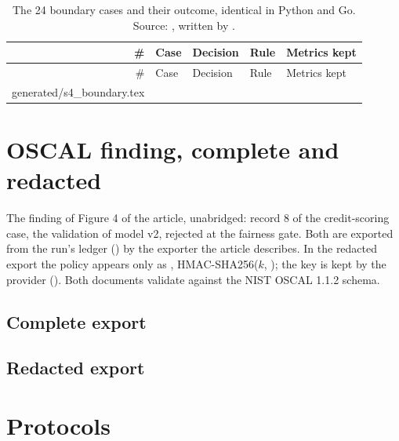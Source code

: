 \documentclass[a4paper,10pt]{article}
\begin{document}
\begin{small}
\begin{longtable}{@{}rP{6.4cm}lP{4.4cm}l@{}}
\caption[The 24 boundary cases]{The 24 boundary cases and their outcome, identical in Python and Go. Source: , written by .}\label{tab:s4}\\
\toprule
\# & Case & Decision & Rule & Metrics kept \\
\midrule
\endfirsthead
\toprule
\# & Case & Decision & Rule & Metrics kept \\
\midrule
\endhead
{} generated/s4_boundary.tex 
\bottomrule
\end{longtable}
\end{small}

\section{OSCAL finding, complete and redacted}
\label{sec:s5}

The finding of Figure 4 of the article, unabridged: record 8 of the credit-scoring case, the validation of model v2, rejected at the fairness gate. Both are exported from the run's ledger () by the exporter the article describes. In the redacted export the policy appears only as , HMAC-SHA256($k$, ); the key is kept by the provider (). Both documents validate against the NIST OSCAL 1.1.2 schema.

\subsection*{Complete export}


\subsection*{Redacted export}


\section{Protocols}
\label{sec:s6}
\end{document}
